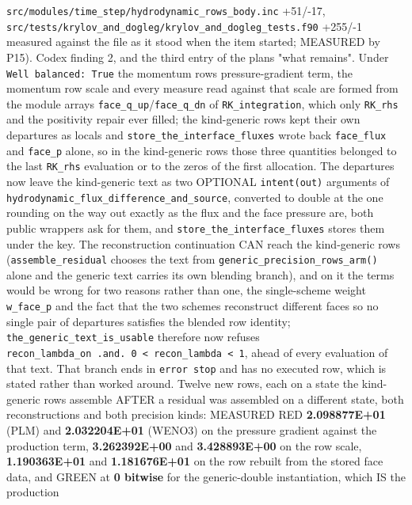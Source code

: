 \documentclass[english,a4paper]{my_memo}
\begin{document}
\begin{itemize}
  \texttt{src/modules/time\_step/hydrodynamic\_rows\_body.inc} +51/-17,
  \texttt{src/tests/krylov\_and\_dogleg/krylov\_and\_dogleg\_tests.f90} +255/-1 measured
  against the file as it stood when the item started; MEASURED by P15). Codex
  finding 2, and the third entry of the plan\textquotesingle s "what remains". Under
  \texttt{Well\ balanced:\ True} the momentum row\textquotesingle s pressure-gradient term, the momentum
  row scale and every measure read against that scale are formed from the
  module arrays \texttt{face\_q\_up}/\texttt{face\_q\_dn} of \texttt{RK\_integration}, which only
  \texttt{RK\_rhs} and the positivity repair ever filled; the kind-generic rows kept
  their own departures as locals and \texttt{store\_the\_interface\_fluxes} wrote back
  \texttt{face\_flux} and \texttt{face\_p} alone, so in the kind-generic rows those three quantities belonged
  to the last \texttt{RK\_rhs} evaluation or to the zeros of the first allocation.
  The departures now leave the kind-generic text as two OPTIONAL \texttt{intent(out)}
  arguments of \texttt{hydrodynamic\_flux\_difference\_and\_source}, converted to double
  at the one rounding on the way out exactly as the flux and the face pressure
  are, both public wrappers ask for them, and \texttt{store\_the\_interface\_fluxes}
  stores them under the key. The reconstruction continuation CAN reach the
  kind-generic rows (\texttt{assemble\_residual} chooses the text from
  \texttt{generic\_precision\_rows\_arm()} alone and the generic text carries its own
  blending branch), and on it the terms would be wrong for two reasons rather
  than one, the single-scheme weight \texttt{w\_face\_p} and the fact that the two
  schemes reconstruct different faces so no single pair of departures satisfies
  the blended row identity; \texttt{the\_generic\_text\_is\_usable} therefore now refuses
  \texttt{recon\_lambda\_on\ .and.\ 0\ \textless{}\ recon\_lambda\ \textless{}\ 1}, ahead of every evaluation of that text.
  That branch ends in \texttt{error\ stop} and has no executed row, which is stated
  rather than worked around. Twelve new rows, each on a state the kind-generic rows assemble
  AFTER a residual was assembled on a different state, both reconstructions and
  both precision kinds: MEASURED RED \textbf{2.098877E+01} (PLM) and \textbf{2.032204E+01}
  (WENO3) on the pressure gradient against the production term,
  \textbf{3.262392E+00} and \textbf{3.428893E+00} on the row scale, \textbf{1.190363E+01} and
  \textbf{1.181676E+01} on the row rebuilt from the stored face data, and GREEN at
  \textbf{0 bitwise} for the generic-double instantiation, which IS the production

\end{itemize}
\end{document}
